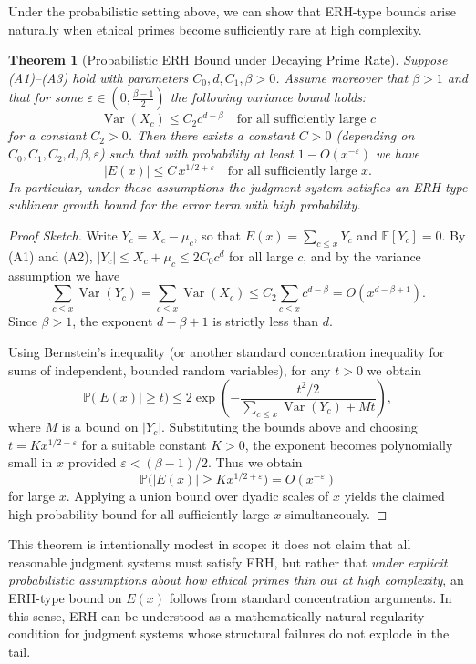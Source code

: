 \documentclass[12pt,a4paper]{article}
\newtheorem{theorem}{Theorem}[section]
\theoremstyle{definition}
\theoremstyle{remark}
\begin{document}
Under the probabilistic setting above, we can show that ERH-type bounds arise naturally when ethical primes become sufficiently rare at high complexity.

\begin{theorem}[Probabilistic ERH Bound under Decaying Prime Rate]
\label{thm:prob_erh}
Suppose (A1)--(A3) hold with parameters $C_0,d,C_1,\beta>0$.
Assume moreover that $\beta > 1$ and that for some $\varepsilon \in (0, \tfrac{\beta-1}{2})$ the following variance bound holds:
\[
\operatorname{Var}(X_c) \le C_2 c^{d-\beta}
\quad \text{for all sufficiently large } c
\]
for a constant $C_2>0$.
Then there exists a constant $C>0$ (depending on $C_0,C_1,C_2,d,\beta,\varepsilon$) such that with probability at least $1 - O(x^{-\varepsilon})$ we have
\[
|E(x)| \le C\, x^{1/2+\varepsilon}
\quad \text{for all sufficiently large } x.
\]
In particular, under these assumptions the judgment system satisfies an ERH-type sublinear growth bound for the error term with high probability.
\end{theorem}

\begin{proof}[Proof Sketch]
Write $Y_c = X_c - \mu_c$, so that $E(x) = \sum_{c \le x} Y_c$ and $\mathbb{E}[Y_c]=0$.
By (A1) and (A2), $|Y_c| \le X_c + \mu_c \le 2 C_0 c^d$ for all large $c$, and by the variance assumption we have
\[
\sum_{c \le x} \operatorname{Var}(Y_c)
 = \sum_{c \le x} \operatorname{Var}(X_c)
 \le C_2 \sum_{c \le x} c^{d-\beta}
 = O(x^{d-\beta+1}).
\]
Since $\beta>1$, the exponent $d-\beta+1$ is strictly less than $d$.

Using Bernstein's inequality (or another standard concentration inequality for sums of independent, bounded random variables), for any $t>0$ we obtain
\[
\mathbb{P}\big(|E(x)| \ge t\big)
\le 2 \exp\left(
 - \frac{t^2/2}{\sum_{c \le x} \operatorname{Var}(Y_c) + M t}
\right),
\]
where $M$ is a bound on $|Y_c|$.
Substituting the bounds above and choosing $t = K x^{1/2+\varepsilon}$ for a suitable constant $K>0$, the exponent becomes polynomially small in $x$ provided $\varepsilon < (\beta-1)/2$.
Thus we obtain
\[
\mathbb{P}\big(|E(x)| \ge K x^{1/2+\varepsilon}\big)
 = O(x^{-\varepsilon})
\]
for large $x$.
Applying a union bound over dyadic scales of $x$ yields the claimed high-probability bound for all sufficiently large $x$ simultaneously.
\end{proof}

This theorem is intentionally modest in scope: it does not claim that all reasonable judgment systems must satisfy ERH, but rather that \emph{under explicit probabilistic assumptions about how ethical primes thin out at high complexity}, an ERH-type bound on $E(x)$ follows from standard concentration arguments.
In this sense, ERH can be understood as a mathematically natural regularity condition for judgment systems whose structural failures do not explode in the tail.
\end{document}
